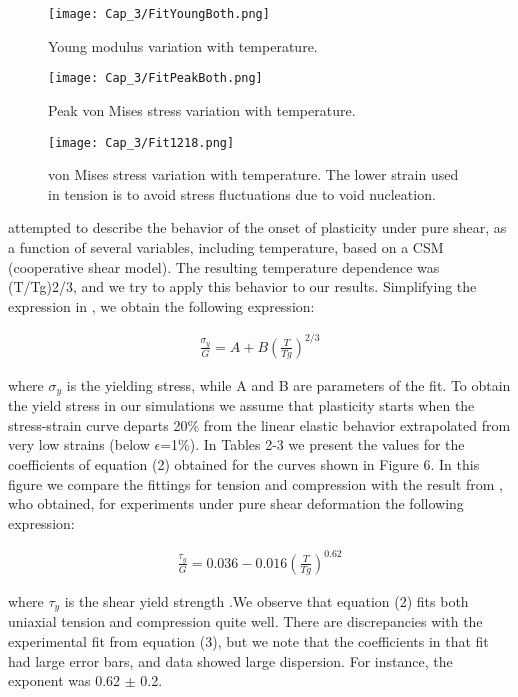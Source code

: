 \begin{figure}[htp]
\centering
\texttt{[image: Cap\_3/FitYoungBoth.png]}
\caption{Young modulus variation with temperature.}
\label{C3:fg:youngVsT}
\end{figure}

\begin{figure}[htp]
\centering
\texttt{[image: Cap\_3/FitPeakBoth.png]}
\caption{Peak von Mises stress variation with temperature.}
\label{C3:fg:peakVMisesVsT}
\end{figure}

\begin{figure}[htp]
\centering
\texttt{[image: Cap\_3/Fit1218.png]}
\caption{von Mises stress variation with temperature. The lower strain used in tension is to avoid stress fluctuations due to void nucleation.}
\label{C3:fg:peakVMises1218VsT}
\end{figure} 

\cite{cheng11} attempted to describe the behavior of the onset of plasticity under pure shear, as a function of several variables, including temperature, based on a CSM (cooperative shear model). The resulting temperature dependence was (T/Tg)2/3, and we try to apply this behavior to our results. Simplifying the expression in \cite{cheng11}, we obtain the following expression:

\begin{eqnarray}
\frac{\sigma{}_{y}}{G} = A+B(\frac{T}{Tg})^{2/3}
\label{C3:eq:onsetPlast}
\end{eqnarray}

where $\sigma{}_{y}$ is the yielding stress, while A and B are parameters of the fit. To obtain the yield stress in our simulations we assume that plasticity starts when the stress-strain curve departs 20\% from the linear elastic behavior extrapolated from very low strains (below $\epsilon$=1\%). In Tables 2-3 we present the values for the coefficients of equation (2) obtained for the curves shown in Figure 6. In this figure we compare the fittings for tension and compression with the result from \cite{johnson05}, who obtained, for experiments under pure shear deformation the following expression:

\begin{eqnarray}
\frac{\tau _{y}}{G} = 0.036-0.016(\frac{T}{Tg})^{0.62}
\label{C3:eq:johnsonSamwer}
\end{eqnarray}
	
where $\tau _{y}$ is the shear yield strength .We observe that equation (2) fits both uniaxial tension and compression quite well. There are discrepancies with the experimental fit from equation (3), but we note that the coefficients in that fit had large error bars, and data showed large dispersion. For instance, the exponent was 0.62 $\pm$ 0.2.

